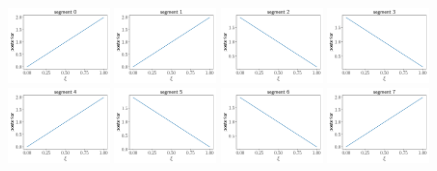 \begin{figure}[htbp!]
\begin{center}
\includegraphics[width=0.24\textwidth]{Figures/posterior_xi_seg_0}
\includegraphics[width=0.24\textwidth]{Figures/posterior_xi_seg_1}
\includegraphics[width=0.24\textwidth]{Figures/posterior_xi_seg_2}
\includegraphics[width=0.24\textwidth]{Figures/posterior_xi_seg_3}
\includegraphics[width=0.24\textwidth]{Figures/posterior_xi_seg_4}
\includegraphics[width=0.24\textwidth]{Figures/posterior_xi_seg_5}
\includegraphics[width=0.24\textwidth]{Figures/posterior_xi_seg_6}
\includegraphics[width=0.24\textwidth]{Figures/posterior_xi_seg_7}

\end{center}
\end{figure}
